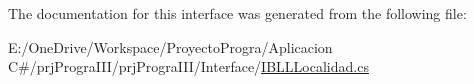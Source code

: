 The documentation for this interface was generated from the following file\+:\begin{DoxyCompactItemize}
\item 
E\+:/\+One\+Drive/\+Workspace/\+Proyecto\+Progra/\+Aplicacion C\#/prj\+Progra\+I\+I\+I/prj\+Progra\+I\+I\+I/\+Interface/\hyperlink{_i_b_l_l_localidad_8cs}{I\+B\+L\+L\+Localidad.\+cs}\end{DoxyCompactItemize}
